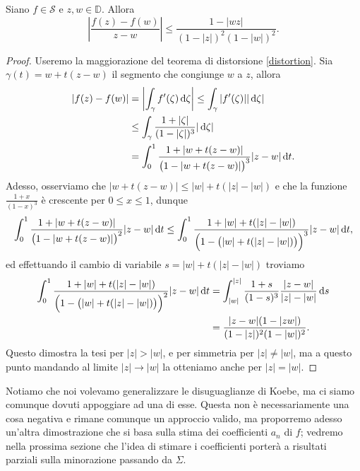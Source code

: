 \begin{thm}
  Siano $f \in \mathcal{S}$ e $z,w \in \mathbb{D}$. Allora
  \begin{equation}\label{maggiorazione}
    \left|\frac{f(z)-f(w)}{z-w}\right| \le \frac{1-|wz|}{(1-|z|)^2(1-|w|)^2}.
  \end{equation}
\end{thm}

\begin{proof}
  Useremo la maggiorazione del teorema di distorsione \eqref{distortion}. Sia $\gamma(t)=w+t(z-w)$ il segmento che congiunge $w$ a $z$, allora
  \begin{align*}
    |f(z)-f(w)|&=\left|\int_{\gamma}f'(\zeta)\mathop{}\!\mathrm{d}\zeta\right| \le \int_{\gamma} |f'(\zeta)||\mathop{}\!\mathrm{d}\zeta| \\
    & \le \int_{\gamma} \frac{1+|\zeta|}{(1-|\zeta|)^3}|\mathop{}\!\mathrm{d}\zeta| \\
    &=\int_0^1 \frac{1+|w+t(z-w)|}{\big(1-|w+t(z-w)|\big)^3}|z-w|\mathop{}\!\mathrm{d} t.
  \end{align*}
  Adesso, osserviamo che $|w+t(z-w)| \le |w|+t(|z|-|w|)$ e che la funzione $\frac{1+x}{(1-x)^3}$ è crescente per $0 \le x \le 1$, dunque
  \begin{gather*}
    \int_0^1 \frac{1+|w+t(z-w)|}{\big(1-|w+t(z-w)|\big)^2}|z-w|\mathop{}\!\mathrm{d} t \le \int_0^1 \frac{1+|w|+t(|z|-|w|)}{\Big(1-\big(|w|+t(|z|-|w|)\big)\Big)^3}|z-w|\mathop{}\!\mathrm{d} t,
  \end{gather*}
  ed effettuando il cambio di variabile $s=|w|+t(|z|-|w|)$ troviamo
  \begin{align*}
    \int_0^1 \frac{1+|w|+t(|z|-|w|)}{\Big(1-\big(|w|+t(|z|-|w|)\big)\Big)^2}|z-w|\mathop{}\!\mathrm{d} t &=\int_{|w|}^{|z|} \frac{1+s}{(1-s)^3}\frac{|z-w|}{|z|-|w|}\mathop{}\!\mathrm{d} s\\
    &=\frac{|z-w|(1-|zw|)}{(1-|z|)^2(1-|w|)^2}.
  \end{align*}
  Questo dimostra la tesi per $|z|>|w|$, e per simmetria per $|z|\not=|w|$, ma a questo punto mandando al limite $|z| \longrightarrow |w|$ la otteniamo anche per $|z|=|w|$.
\end{proof}

Notiamo che noi volevamo generalizzare le disuguaglianze di Koebe, ma ci siamo comunque dovuti appoggiare ad una di esse. Questa non è necessariamente una cosa negativa e rimane comunque un approccio valido, ma proporremo adesso un'altra dimostrazione che si basa sulla stima dei coefficienti $a_n$ di $f$; vedremo nella prossima sezione che l'idea di stimare i coefficienti porterà a risultati parziali sulla minorazione passando da $\Sigma$.

